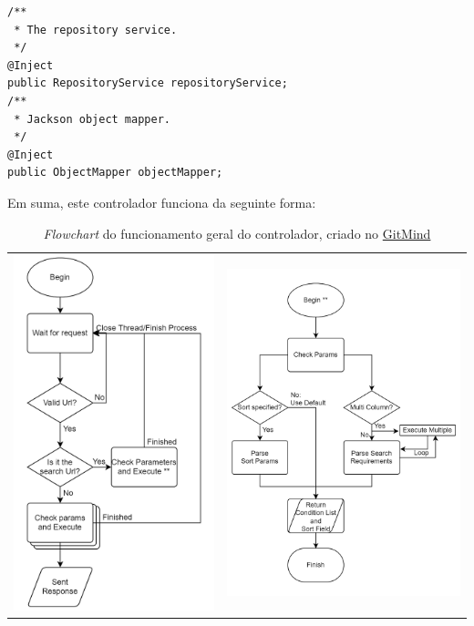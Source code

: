 \begin{lstlisting}[frame=bt,numbers=none]
 /**
 * The repository service.
 */
@Inject
public RepositoryService repositoryService;
/**
 * Jackson object mapper.
 */
@Inject
public ObjectMapper objectMapper;
\end{lstlisting}

Em suma, este controlador funciona da seguinte forma:

\begin{table}[!hbt]
  \centering
  \begin{tabular}{ll}
    \includegraphics[width=6cm]{figuras/flowchart2.png}
    \label{fig:flow2} &
    \includegraphics[width=7cm]{figuras/flowchart3.png}
    \label{fig:flow3}   \\
  \end{tabular}
  \caption{\textit{Flowchart} do funcionamento geral do controlador, criado no \href{https://gitmind.com/app/flowchart/8d511739737}{GitMind}}
\end{table}
\FloatBarrier

